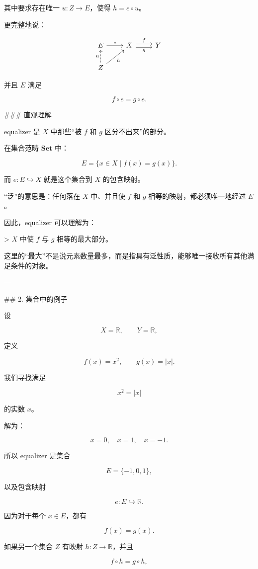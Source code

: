 \documentclass{ctexart}
\begin{document}
\begin{markdown}
其中要求存在唯一 $u:Z\to E$，使得 $h=e\circ u$。

更完整地说：
\end{markdown}
\[
\begin{tikzcd}
E \arrow[r,"e"] & X \arrow[r,shift left, "f"] \arrow[r,shift right,"g"'] & Y \\
Z \arrow[u,"u",dashed] \arrow[ur,"h"'] & &
\end{tikzcd}
\]
\begin{markdown}
并且 $E$ 满足

$$
f\circ e=g\circ e.
$$

### 直观理解

equalizer 是 $X$ 中那些“被 $f$ 和 $g$ 区分不出来”的部分。

在集合范畴 $\mathbf{Set}$ 中：

$$
E=\{x\in X\mid f(x)=g(x)\}.
$$

而 $e:E\hookrightarrow X$ 就是这个集合到 $X$ 的包含映射。

“泛”的意思是：任何落在 $X$ 中、并且使 $f$ 和 $g$ 相等的映射，都必须唯一地经过 $E$。

因此，equalizer 可以理解为：

> $X$ 中使 $f$ 与 $g$ 相等的最大部分。

这里的“最大”不是说元素数量最多，而是指具有泛性质，能够唯一接收所有其他满足条件的对象。

---

## 2. 集合中的例子

设

$$
X=\mathbb{R},\qquad Y=\mathbb{R},
$$

定义

$$
f(x)=x^2,\qquad g(x)=|x|.
$$

我们寻找满足

$$
x^2=|x|
$$

的实数 $x$。

解为：

$$
x=0,\quad x=1,\quad x=-1.
$$

所以 equalizer 是集合

$$
E=\{-1,0,1\},
$$

以及包含映射

$$
e:E\hookrightarrow \mathbb{R}.
$$

因为对于每个 $x\in E$，都有

$$
f(x)=g(x).
$$

如果另一个集合 $Z$ 有映射 $h:Z\to\mathbb{R}$，并且

$$
f\circ h=g\circ h,
$$


\end{markdown}
\end{document}
